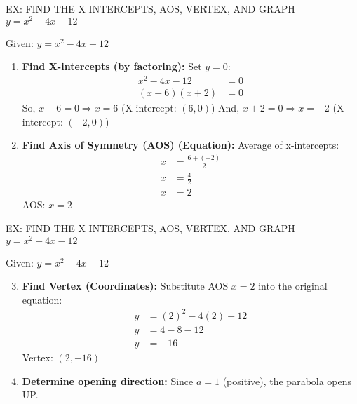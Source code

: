 \documentclass[aspectratio=169]{beamer}
\begin{document}
\begin{frame}{EX: FIND THE X INTERCEPTS, AOS, VERTEX, AND GRAPH $y = x^2 - 4x - 12$}
    \begin{tcolorbox}[colback=lightgray,colframe=primary,title=Step-by-Step Solution]
        \footnotesize
        Given: $y = x^2 - 4x - 12$
        
        \begin{enumerate}
            \item \textbf{Find X-intercepts (by factoring):}
            Set $y=0$:
            \begin{align*}
                x^2 - 4x - 12 &= 0 \\
                (x - 6)(x + 2) &= 0
            \end{align*}
            So, $x - 6 = 0 \Rightarrow x = 6$ (X-intercept: $(6,0)$)
            And, $x + 2 = 0 \Rightarrow x = -2$ (X-intercept: $(-2,0)$)
            
            \item \textbf{Find Axis of Symmetry (AOS) (Equation):}
            Average of x-intercepts:
            \begin{align*}
                x &= \frac{6 + (-2)}{2} \\
                x &= \frac{4}{2} \\
                x &= 2
            \end{align*}
            AOS: $x = 2$
        \end{enumerate}
    \end{tcolorbox}
\end{frame}

\begin{frame}{EX: FIND THE X INTERCEPTS, AOS, VERTEX, AND GRAPH $y = x^2 - 4x - 12$}
    \begin{tcolorbox}[colback=lightgray,colframe=primary,title=Step-by-Step Solution (Cont.)]
        \footnotesize
        Given: $y = x^2 - 4x - 12$
        
        \begin{enumerate}
            \setcounter{enumi}{2}
            \item \textbf{Find Vertex (Coordinates):}
            Substitute AOS $x=2$ into the original equation:
            \begin{align*}
                y &= (2)^2 - 4(2) - 12 \\
                y &= 4 - 8 - 12 \\
                y &= -16
            \end{align*}
            Vertex: $(2, -16)$
            
            \item \textbf{Determine opening direction:}
            Since $a=1$ (positive), the parabola opens UP.
        \end{enumerate}
    \end{tcolorbox}
\end{frame}
\end{document}
